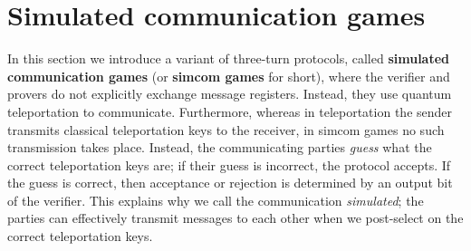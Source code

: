 \section{Simulated communication games}
\label{sec:prelim_simcom}

In this section we introduce a variant of three-turn protocols, called \textbf{simulated communication games} (or \textbf{simcom games} for short), where the verifier and provers do not explicitly exchange message registers. Instead, they use quantum teleportation to communicate. Furthermore, whereas in teleportation the sender transmits classical teleportation keys to the receiver, in simcom games no such transmission takes place. Instead, the communicating parties \emph{guess} what the correct teleportation keys are; if their guess is incorrect, the protocol accepts. If the guess is correct, then acceptance or rejection is determined by an output bit of the verifier. This explains why we call the communication \emph{simulated}; the parties can effectively transmit messages to each other when we post-select on the correct teleportation keys.


